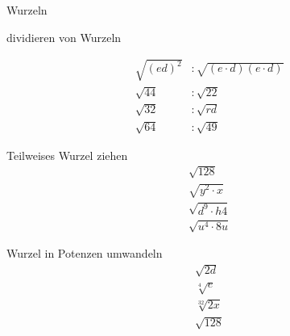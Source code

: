 \documentclass[12pt]{article}
\begin{document}
\begin{section}{Wurzeln}
\begin{subsection}{dividieren von Wurzeln}
\begin{multicols}{2}
        \begin{align*}
        \sqrt{(ed)^{2}} 	&: \sqrt{(e \cdot d) (e \cdot d)}\\
		\sqrt{44}	&:		\sqrt{22}		\\
		\sqrt{32}	&:		\sqrt{rd}	\\
		\sqrt{64} 	&:		\sqrt{49}
        \end{align*}
        \end{multicols}
	\end{subsection}
	\begin{multicols}{2}
	\begin{subsection}{Teilweises Wurzel ziehen}
		\begin{align*}
		\sqrt{128} \\
		\sqrt{y^{2} \cdot x} \\
		\sqrt{d^{9} \cdot h{4}} \\
		\sqrt{u^{4} \cdot 8u}
		\end{align*}
	\end{subsection}
	\begin{subsection}{Wurzel in Potenzen umwandeln}
		\begin{align*}
		\sqrt{2d}	\\
		\sqrt[4]{e}	\\
		\sqrt[32]{2x} \\
		\sqrt{128}
		\end{align*}
	\end{subsection}
	\end{multicols}
\end{section}
\end{document}
